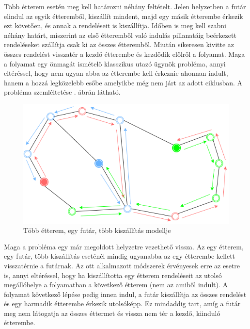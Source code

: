 

Több étterem esetén meg kell határozni néhány feltételt. Jelen helyzetben a futár elindul az egyik étteremből, kiszállít mindent, majd egy másik étterembe érkezik ezt követően, és annak a rendeléseit is kiszállítja. Időben is meg kell szabni néhány határt, miszerint az első étteremből való indulás pillanatáig beérkezett rendeléseket szállítja csak ki az összes étteremből. Miután sikeresen kivitte az összes rendelést visszatér a kezdő étterembe és kezdődik előlről a folyamat. Maga a folyamat egy önmagát ismételő klasszikus utazó ügynök probléma, annyi eltéréssel, hogy nem ugyan abba az étterembe kell érkeznie ahonnan indult, hanem a hozzá legközelebb esőbe amelyikbe még nem járt az adott ciklusban. A probléma szemléltetése . ábrán látható.

\begin{figure}[h!]
\centering
\includegraphics[scale=0.6]{images/Circulartsp.png}
\caption{Több étterem, egy futár, több kiszállítás modellje}
\label{fig:model3}
\end{figure}



Maga a probléma egy már megoldott helyzetre vezethető vissza. Az egy étterem, egy futár, több kiszállítás eseténél mindig ugyanabba az egy étterembe kellett visszatérnie a futárnak. Az ott alkalmazott módszerek érvényesek erre az esetre is, annyi eltéréssel, hogy ha kiszállította egy étterem rendeléseit az utolsó megállóhelye a folyamatban a következő étterem (nem az amiből indult). A folyamat következő lépése pedig innen indul, a futár kiszállítja az összes rendelést és egy harmadik étterembe érkezik utolsóképp. Ez mindaddig tart, amíg a futár meg nem látogatja az összes éttermet és vissza nem tér a kezdő, kiinduló étterembe. 


